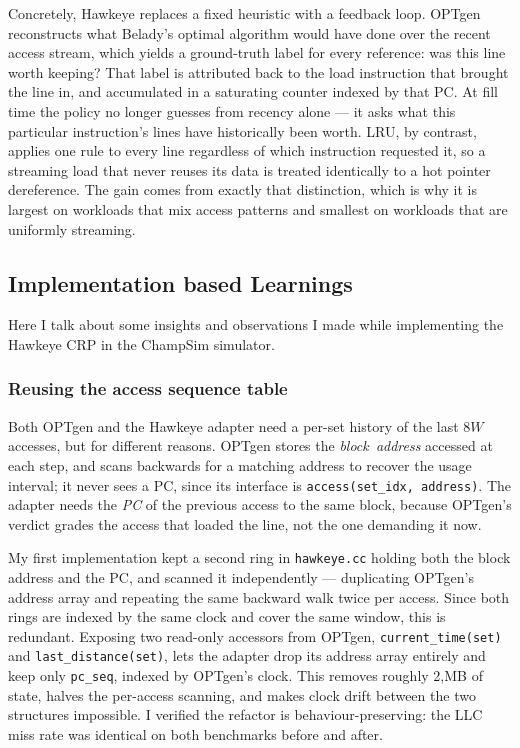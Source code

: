 \documentclass[11pt]{article}
\begin{document}
Concretely, Hawkeye replaces a fixed heuristic with a feedback loop. OPTgen reconstructs what Belady's optimal algorithm would have done over the recent access stream, which yields a ground-truth label for every reference: was this line worth keeping? That label is attributed back to the load instruction that brought the line in, and accumulated in a saturating counter indexed by that PC. At fill time the policy no longer guesses from recency alone --- it asks what this particular instruction's lines have historically been worth. LRU, by contrast, applies one rule to every line regardless of which instruction requested it, so a streaming load that never reuses its data is treated identically to a hot pointer dereference. The gain comes from exactly that distinction, which is why it is largest on workloads that mix access patterns and smallest on workloads that are uniformly streaming.

\subsection{Implementation based Learnings}

Here I talk about some insights and observations I made while implementing the Hawkeye CRP in the ChampSim simulator.

\subsubsection{Reusing the access sequence table}

Both OPTgen and the Hawkeye adapter need a per-set history of the last $8W$ accesses, but for different reasons. OPTgen stores the \emph{block\ address} accessed at each step, and scans backwards for a matching address to recover the usage interval; it never sees a PC, since its interface is \texttt{access(set\_idx, address)}. The adapter needs the \emph{PC} of the previous access to the same block, because OPTgen's verdict grades the access that loaded the line, not the one demanding it now.

My first implementation kept a second ring in \texttt{hawkeye.cc} holding both the block address and the PC, and scanned it independently --- duplicating OPTgen's address array and repeating the same backward walk twice per access. Since both rings are indexed by the same clock and cover the same window, this is redundant. Exposing two read-only accessors from OPTgen, \texttt{current\_time(set)} and \texttt{last\_distance(set)}, lets the adapter drop its address array entirely and keep only \texttt{pc\_seq}, indexed by OPTgen's clock. This removes roughly 2,MB of state, halves the per-access scanning, and makes clock drift between the two structures impossible. I verified the refactor is behaviour-preserving: the LLC miss rate was identical on both benchmarks before and after.
\end{document}
